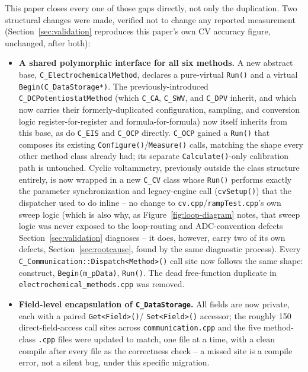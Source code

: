 This paper closes every one of those gaps directly, not only the
duplication. Two structural changes were made, verified not to change any
reported measurement (Section~\ref{sec:validation} reproduces this paper's
own CV accuracy figure, unchanged, after both):
\begin{itemize}
\item \textbf{A shared polymorphic interface for all six methods.} A new
  abstract base, \texttt{C\_ElectrochemicalMethod}, declares a pure-virtual
  \texttt{Run()} and a virtual \texttt{Begin(C\_DataStorage*)}. The
  previously-introduced \texttt{C\_DCPotentiostatMethod} (which
  \texttt{C\_CA}, \texttt{C\_SWV}, and \texttt{C\_DPV} inherit, and which
  now carries their formerly-duplicated configuration, sampling, and
  conversion logic register-for-register and formula-for-formula) now
  itself inherits from this base, as do \texttt{C\_EIS} and \texttt{C\_OCP}
  directly. \texttt{C\_OCP} gained a \texttt{Run()} that composes its
  existing \texttt{Configure()}/\texttt{Measure()} calls, matching the
  shape every other method class already had; its separate
  \texttt{Calculate()}-only calibration path is untouched. Cyclic
  voltammetry, previously outside the class structure entirely, is now
  wrapped in a new \texttt{C\_CV} class whose \texttt{Run()} performs
  exactly the parameter synchronization and legacy-engine call
  (\texttt{cvSetup()}) that the dispatcher used to do inline -- no change
  to \texttt{cv.cpp}/\texttt{rampTest.cpp}'s own sweep logic (which is
  also why, as Figure~\ref{fig:loop-diagram} notes, that sweep logic was
  never exposed to the loop-routing and ADC-convention defects
  Section~\ref{sec:validation} diagnoses -- it does, however, carry two
  of its own defects, Section~\ref{sec:rootcause}, found by the same
  diagnostic process). Every \texttt{C\_Communication::Dispatch<Method>()}
  call site now follows the same shape: construct, \texttt{Begin(m\_pData)},
  \texttt{Run()}. The dead free-function duplicate in
  \texttt{electrochemical\_methods.cpp} was removed.
\item \textbf{Field-level encapsulation of \texttt{C\_DataStorage}.} All
  fields are now private, each with a paired \texttt{Get<Field>()}/
  \texttt{Set<Field>()} accessor; the roughly 150 direct-field-access call
  sites across \texttt{communication.cpp} and the five method-class
  \texttt{.cpp} files were updated to match, one file at a time, with a
  clean compile after every file as the correctness check -- a missed site
  is a compile error, not a silent bug, under this specific migration.
\end{itemize}
